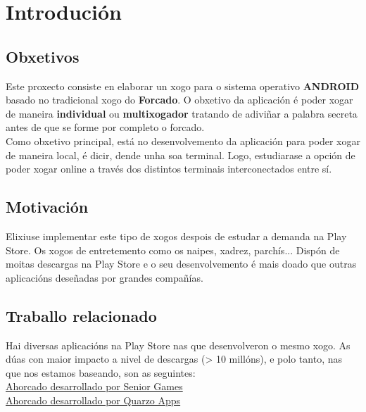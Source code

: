 \chapter{Introdución}
\label{chap:introducion}
\section{Obxetivos}
Este proxecto consiste en elaborar un xogo para o sistema operativo \textbf{ANDROID} basado no tradicional xogo do \textbf{Forcado}. O obxetivo da aplicación é poder xogar de maneira \textbf{individual} ou \textbf{multixogador} tratando de adiviñar a palabra secreta antes de que se forme por completo o forcado.\\
Como obxetivo principal, está no desenvolvemento da aplicación para poder xogar de maneira local, é dicir, dende unha soa terminal.
Logo, estudiarase a opción de poder xogar online a través dos distintos terminais interconectados entre sí.
\section{Motivación}
Elixiuse implementar este tipo de xogos despois de estudar a demanda na Play Store. Os xogos de entretemento como os naipes, xadrez, parchís... Dispón de moitas descargas na Play Store e o seu desenvolvemento é mais doado que outras aplicacións deseñadas por grandes compañías.


\section{Traballo relacionado}
Hai diversas aplicacións na Play Store nas que desenvolveron o mesmo xogo.
As dúas con maior impacto a nivel de descargas (> 10 millóns), e polo tanto, nas que nos estamos baseando, son as seguintes:\\
\href{https://play.google.com/store/apps/details?id=com.tellmewow.senior.hangman&hl=es&gl=US}{Ahorcado desarrollado por Senior Games}\\
\href{https://play.google.com/store/apps/details?id=com.quarzo.hangmanwords&hl=es&gl=US}{Ahorcado desarrollado por Quarzo Apps}

 \let\cleardoublepage=\clearpage 

